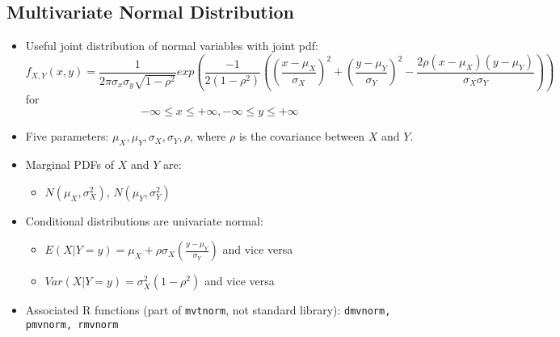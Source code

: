 \documentclass[12pt]{article}
\begin{document}
\subsection{Multivariate Normal Distribution}

\begin{itemize}
	\item Useful joint distribution of normal variables with joint pdf:
	      \[
		      f_{X, Y} (x, y) = \frac{1}{2\pi \sigma_x \sigma_y \sqrt{1 - \rho^2}} exp\left(\frac{-1}{2(1-\rho^2)}\left((\frac{x-\mu_X}{\sigma_X})^2 + (\frac{y - \mu_Y}{\sigma_Y})^2 - \frac{2\rho(x - \mu_X)(y-\mu_Y)}{\sigma_X\sigma_Y}\right)\right)
	      \]
	      for
	      \[
		      -\infty \leq x \leq +\infty, -\infty \leq y \leq +\infty
	      \]
	\item Five parameters: $\mu_X, \mu_Y, \sigma_X, \sigma_Y, \rho$,
	      where $\rho$ is the covariance between $X$ and $Y$.
	\item Marginal PDFs of $X$ and $Y$ are:
	      \begin{itemize}
		      \item $N(\mu_X, \sigma_X^2)$, $N(\mu_Y, \sigma_Y^2)$
	      \end{itemize}
	\item Conditional distributions are univariate normal:
	      \begin{itemize}
		      \item $E(X | Y = y) = \mu_X + \rho\sigma_X (\frac{y - \mu_Y}{\sigma_Y})$ and vice versa
		      \item $Var(X | Y = y) = \sigma_X^2 (1 - \rho^2)$ and vice versa
	      \end{itemize}
	\item Associated R functions (part of \verb|mvtnorm|, not standard library): \verb|dmvnorm, pmvnorm, rmvnorm|
\end{itemize}
\end{document}
